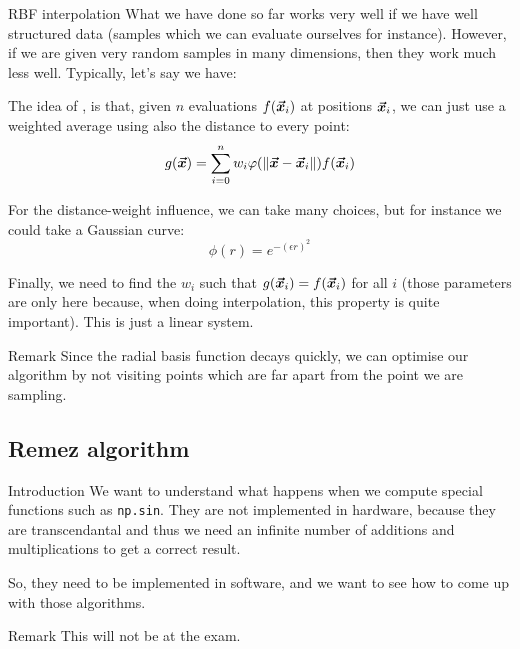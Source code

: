 \documentclass[a4paper]{article}
\begin{document}
\begin{parag}{RBF interpolation}
    What we have done so far works very well if we have well structured data (samples which we can evaluate ourselves for instance). However, if we are given very random samples in many dimensions, then they work much less well. Typically, let's say we have:

    The idea of , is that, given $n$ evaluations $f\left(\bvec{x}_i\right)$ at positions $\bm{\protect\vec{x}}_i$, we can just use a weighted average using also the distance to every point: 
    \[g\left(\bvec{x}\right) = \sum_{i=0}^{n} w_i \phi\left(\left\|\bvec{x} - \bvec{x}_i\right\|\right) f\left(\bvec{x}_i\right)\]

    For the distance-weight influence, we can take many choices, but for instance we could take a Gaussian curve: 
    \[\phi\left(r\right) = e^{-\left(\epsilon r\right)^2}\]
    
    Finally, we need to find the $w_i$ such that $g\left(\bvec{x}_i\right) = f\left(\bvec{x}_i\right)$ for all $i$ (those parameters are only here because, when doing interpolation, this property is quite important). This is just a linear system.

    \begin{subparag}{Remark}
        Since the radial basis function decays quickly, we can optimise our algorithm by not visiting points which are far apart from the point we are sampling.
    \end{subparag}
\end{parag}

\subsection{Remez algorithm}
\begin{parag}{Introduction}
    We want to understand what happens when we compute special functions such as \texttt{np.sin}. They are not implemented in hardware, because they are transcendantal and thus we need an infinite number of additions and multiplications to get a correct result.

    So, they need to be implemented in software, and we want to see how to come up with those algorithms.

    \begin{subparag}{Remark}
        This will not be at the exam.
    \end{subparag}
    
\end{parag}
\end{document}
